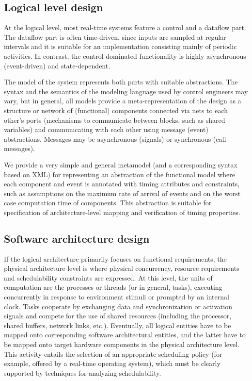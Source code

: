 \subsection{Logical level design }
\label{sub:Logical-level-design}

At the logical level, most real-time systems feature a control and a
dataflow part. The dataflow part is often time-driven, since inputs
are sampled at regular intervals and it is suitable for an
implementation consisting mainly of periodic activities. In contrast,
the control-dominated functionality is highly asynchronous
(event-driven) and state-dependent.

The model of the system represents both parts with suitable
abstractions.  The syntax and the semantics of the modeling language
used by control engineers may vary, but in general, all models provide
a meta-representation of the design as a structure or network of
(functional) components connected via nets to each other's ports
(mechanisms to communicate between blocks, such as shared variables)
and communicating with each other using message (event)
abstractions. Messages may be asynchronous (signals) or synchronous
(call messages).

We provide a very simple and general metamodel (and a corresponding
syntax based on XML) for representing an abstraction of the functional
model where each component and event is annotated with timing
attributes and constraints, such as assumptions on the maximum rate of
arrival of events and on the worst case computation time of
components. This abstraction is suitable for specification of
architecture-level mapping and verification of timing properties.


\subsection{Software architecture design }
\label{sub:Software-architecture-design}

If the logical architecture primarily focuses on functional
requirements, the physical architecture level is where physical
concurrency, resource requirements and schedulability constraints are
expressed. At this level, the units of computation are the processes
or threads (or in general, tasks), executing concurrently in response
to environment stimuli or prompted by an internal clock. Tasks
cooperate by exchanging data and synchronization or activation signals
and compete for the use of shared resources (including the processor,
shared buffers, network links, etc.). Eventually, all logical entities
have to be mapped onto corresponding software architectural entities,
and the latter have to be mapped onto target hardware components in
the physical architecture level. This activity entails the selection
of an appropriate scheduling policy (for example, offered by a
real-time operating system), which must be clearly supported by
techniques for analyzing schedulability.

